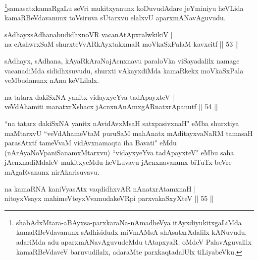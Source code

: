 \begin{artha}
\footnote{shabAdxMtara-aBAyxsa-parxkaraNa-nAmadheVya itAyxdiyukitxgaLiMda kamaRBeVdavanunx sAdhisidudx miVmAMsA shAsatxrXdalilx kANuvudu. adariMda adu aparxmANavAguvudeMdu tAtapxyaR. oMdeV PalavAguvalilx kamaRBeVdaveV baruvudilalx, adaraMte parxkaqtadalUlx tiLiyabeVku.}samasatxkamaRgaLu seVri mukitxyanunx koDuvudAdare jeYminiyu heVLida kamaRBeVdavanunx toVsiruva sUtarxvu elalxvU aparxmANavAguvudu.
\end{artha}


\begin{shl}
sAdhayxsAdhanabudidhxnoVR vacanAtApxralwkikiV |\\
na cAshwrxSaM shurxteVvARkAyxtakxmaR moVkaSxPalaM kavxcitf \hfill || 53 ||
\end{shl}

\begin{artha}
sAdhayx, sAdhana, kAyaRkAraNajAcnxnavu paraloVka viSayadalilx namage vacanadiMda sididhxsuvudu, shurxti vAkayxdiMda kamaRkekx moVkaSxPala veMbudanunx nAnu keVLilalx.
\end{artha}


\begin{shl}
na tatarx dakiSxNA yanitx vidayxyeYva tadApayxteV |\\
veVdAhamiti manatxrXshacx jAcnxnAnAmxgARnatxrApanutf \hfill || 54 ||
\end{shl}


\begin{artha}
``na tatarx dakiSxNA yanitx nAvidAvxMsaH satxpasivxnaH" eMba shurxtiya maMtarxvU ``veVdAhameVtaM puruSaM mahAnatx mAditayxvaNaRM tamasaH parasAtxtf tameVvaM vidAvxnamaqta iha Bavati" eMdu (nArAyaNoVpaniSanamxMtarxvu) ``vidayxyeYva tadApayxteV" eMbu saha jAcnxnadiMdaleV mukitxyeMdu heVLuvavu jAcnxnavanunx biTuTx beVre mAgaRvanunx nirAkarisuvavu.
\end{artha}


\begin{shl}
na kamaRNA kaniVyasAtx vaqdidhxvAR nAnatxrAtamxnaH |\\
nitoyxV\s sayx mahimeVteyxVvamudakeVR\s pi parxvakaSxyXteV \hfill || 55 ||
\end{shl}

